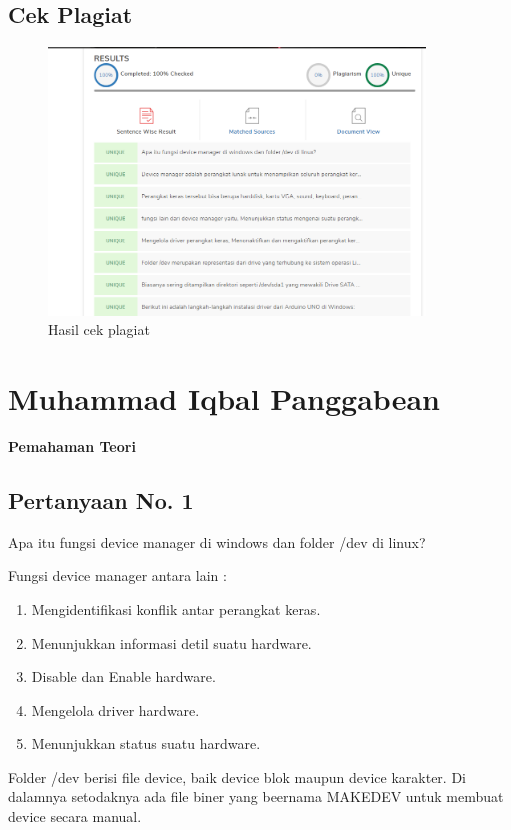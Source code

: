 	

	\subsection{Cek Plagiat}
	\begin{figure}[H]
		\includegraphics[width=10cm]{figures/chapter5/1174057/teori/plagiarisme.png}
		\centering
		\caption{Hasil cek plagiat}
	\end{figure}
	
	
\section{Muhammad Iqbal Panggabean}
{\Large \textbf{Pemahaman Teori}}
\subsection{Pertanyaan No. 1}
Apa itu fungsi device manager di windows dan folder /dev di linux?

\hfill \break
Fungsi device manager antara lain :
\begin{enumerate}
	\item Mengidentifikasi konflik antar perangkat keras.
	\item Menunjukkan informasi detil suatu hardware.
	\item Disable dan Enable hardware.
	\item Mengelola driver hardware.
	\item Menunjukkan status suatu hardware.
\end{enumerate}

\hfill \break
Folder /dev berisi file device, baik device blok maupun device karakter. Di dalamnya setodaknya ada file biner yang beernama MAKEDEV untuk membuat device secara manual.

